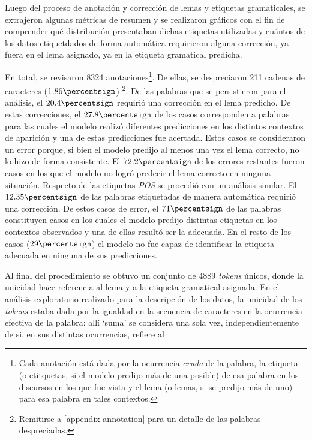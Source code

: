 Luego del proceso de anotaci\'on y correcci\'on de lemas y etiquetas gramaticales,
se extrajeron algunas m\'etricas de resumen y se realizaron gr\'aficos con el fin de
comprender qu\'e distribuci\'on presentaban dichas etiquetas utilizadas y cu\'antos de los
datos etiquetdados de forma autom\'atica requirieron alguna correcci\'on, ya fuera en el
lema asignado, ya en la etiqueta gramatical predicha.
\par
En total, se revisaron 8324 anotaciones\footnote{Cada anotaci\'on est\'a dada por
la ocurrencia \textit{cruda} de la palabra, la etiqueta (o etitquetas, si el modelo
predijo m\'as de una posible) de esa palabra en los discursos en los que fue vista y el
lema (o lemas, si se predijo m\'as de uno) para esa palabra en tales contextos.}.
De ellas, se despreciaron 211 cadenas de caracteres ($1.86\percentsign$)
\footnote{Remitirse a \ref{appendix-annotation} para un detalle de las palabras
despreciadas.}. De las palabras que se persistieron para el an\'alisis,
el $20.4\percentsign$ requiri\'o una correcci\'on en el lema predicho.
De estas correcciones, el $27.8\percentsign$ de los casos corresponden a
palabras para las cuales el modelo realiz\'o diferentes predicciones en los distintos
contextos de aparici\'on y una de estas predicciones fue acertada. Estos casos se
consideraron un error porque, si bien el modelo predijo al menos una vez el lema correcto,
no lo hizo de forma consistente. El $72.2\percentsign$ de los errores
restantes fueron casos en los que el modelo no logr\'o predecir el lema correcto en
ninguna situaci\'on.
Respecto de las etiquetas \textit{POS} se procedi\'o con un an\'alisis similar.
El $12.35\percentsign$ de las palabras etiquetadas de manera autom\'atica requiri\'o
una correcci\'on. De estos casos de error, el $71\percentsign$ de las palabras
constituyen casos en los cuales el modelo predijo distintas etiquetas en los contextos
observados y una de ellas result\'o ser la adecuada.
En el resto de los casos ($29\percentsign$) el modelo no fue capaz de
identificar la etiqueta adecuada en ninguna de sus predicciones.
\par
Al final del procedimiento se obtuvo un conjunto de 4889 \textit{tokens} \'unicos,
donde la unicidad hace referencia al lema y a la etiqueta gramatical asignada.
En el an\'alisis exploratorio realizado para la descripci\'on de los datos, la unicidad
de los \textit{tokens} estaba dada por la igualdad en la secuencia de caracteres
en la ocurrencia efectiva de la palabra: all\'i `suma' se considera
una sola vez, independientemente de si, en sus distintas ocurrencias, refiere al
